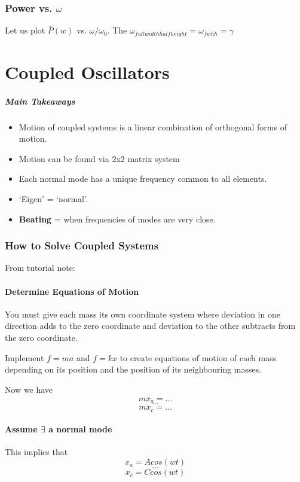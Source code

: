 \documentclass[a4paper,12pt]{report}
\begin{document}
\subsection{Power vs. $\omega$}
Let us plot $\bar{P}(w)$ vs. $\omega / \omega_0$. The $\omega_{full width half height} = \omega_{fwhh} = \gamma$

\chapter{Coupled Oscillators}
\paragraph{Main Takeaways}
\begin{itemize}
\item Motion of coupled systems is a linear combination of orthogonal forms of motion.
\item Motion can be found via 2x2 matrix system
\item Each normal mode has a unique frequency common to all elements. 
\item `Eigen' = `normal'.
\item \textbf{Beating} = when frequencies of modes are very close.
\end{itemize}

\subsection{How to Solve Coupled Systems}
From tutorial note: 
\subsubsection{Determine Equations of Motion}
You must give each mass its own coordinate system where deviation in one direction adds to the zero 
coordinate and deviation to the other subtracts from the zero coordinate.

Implement $f = ma$ and $f = kx$ to create equations of motion of each mass depending on its position 
and the position of its neighbouring masses.

Now we have $$m\ddot{x_a} = ...$$ $$...$$ $$m\ddot{x_c} = ...$$

\subsubsection{Assume $\exists$ a normal mode}
This implies that $$x_a = A cos(wt)$$ $$...$$ $$x_c = C cos(wt)$$
\end{document}
